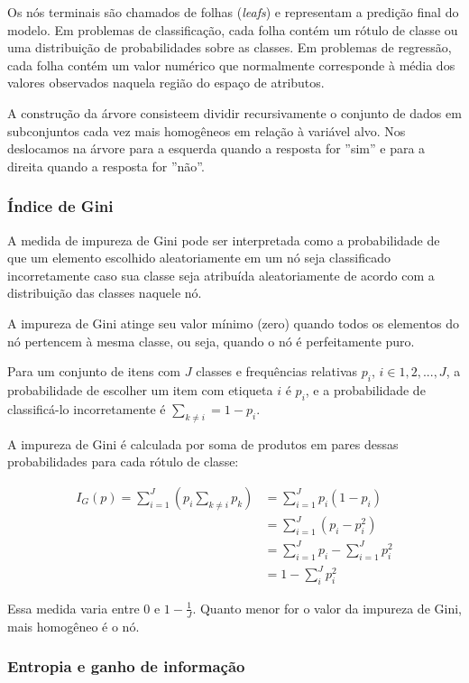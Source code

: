 \documentclass{article}
\begin{document}
Os nós terminais são chamados de folhas (\textit{leafs}) e representam a 
predição final do modelo. Em problemas de classificação, cada folha contém 
um rótulo de classe ou uma distribuição de probabilidades sobre as classes.
Em problemas de regressão, cada folha contém um valor numérico que normalmente 
corresponde à média dos valores observados naquela região do espaço de 
atributos.

A construção da árvore consisteem dividir recursivamente o conjunto de dados
em subconjuntos cada vez mais homogêneos em relação à variável alvo. Nos deslocamos
na árvore para a esquerda quando a resposta for ''sim'' e para a direita quando a 
resposta for ''não''.

\subsubsection{Índice de Gini}

A medida de impureza de Gini pode ser interpretada como a probabilidade de 
que um elemento escolhido aleatoriamente em um nó seja classificado incorretamente
caso sua classe seja atribuída aleatoriamente de acordo com a distribuição das 
classes naquele nó.

A impureza de Gini atinge seu valor mínimo (zero) quando todos os elementos do nó 
pertencem à mesma classe, ou seja, quando o nó é perfeitamente puro.

Para um conjunto de itens com $J$ classes e frequências relativas $p_i$,
$i \in {1, 2, ..., J}$, a probabilidade de escolher um item com etiqueta 
$i$ é $p_i$, e a probabilidade de classificá-lo incorretamente é
$\sum_{k \neq i} = 1 - p_i$.

A impureza de Gini é calculada por soma de produtos em pares dessas 
probabilidades para cada rótulo de classe:

\begin{align}
    I_{G}(p) = \sum_{i = 1}^{J}\left(p_i \sum_{k \neq i}p_k\right) &= \sum_{i = 1}^{J}p_i(1 - p_i) \\
    &= \sum_{i = 1}^{J}(p_i - p_i^2) \\
    &= \sum_{i = 1}^{J}p_i - \sum_{i = 1}^{J}p_i^2 \\
    &= 1- \sum_{i}^{J}p_i^2
\end{align}

Essa medida varia entre $0$ e $1 - \frac{1}{J}$. Quanto menor for o 
valor da impureza de Gini, mais homogêneo é o nó.

\subsubsection{Entropia e ganho de informação}
\end{document}
